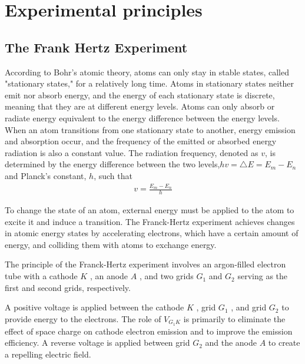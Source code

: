 \documentclass[UTF8]{article}
\begin{document}
        
	\section{Experimental principles}   
	\subsection{The Frank Hertz Experiment}
	According to Bohr's atomic theory, atoms can only stay in stable states, called "stationary states," for a relatively long time. Atoms in stationary states neither emit nor absorb energy, and the energy of each stationary state is discrete, meaning that they are at different energy levels. Atoms can only absorb or radiate energy equivalent to the energy difference between the energy levels. When an atom transitions from one stationary state to another, energy emission and absorption occur, and the frequency of the emitted or absorbed energy radiation is also a constant value. The radiation frequency, denoted as $v$, is determined by the energy difference between the two levels,$hv = \bigtriangleup E=E_m-E_n$   and Planck's constant, $h$, such that 
	\begin{eqnarray}
	v = \frac{E_m-E_n}{h} 
	\end{eqnarray}
	
	To change the state of an atom, external energy must be applied to the atom to excite it and induce a transition. The Franck-Hertz experiment achieves changes in atomic energy states by accelerating electrons, which have a certain amount of energy, and colliding them with atoms to exchange energy.
	
	The principle of the Franck-Hertz experiment involves an argon-filled electron tube with a cathode $K$ , an anode $A$ , and two grids  $G_1$ and $G_2$  serving as the first and second grids, respectively.
	
	A positive voltage is applied between the cathode $K$ , grid $G_1$ , and grid $G_2$  to provide energy to the electrons. The role of $V_{G_{1}K}$  is primarily to eliminate the effect of space charge on cathode electron emission and to improve the emission efficiency. A reverse voltage   is applied between grid $G_2$  and the anode $A$ to create a repelling electric field.
	
\end{document}
